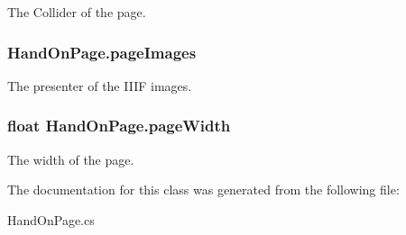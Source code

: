 The Collider of the page. 

\subsubsection[{page\+Images}]{ Hand\+On\+Page.\+page\+Images}\label{class_hand_on_page_a700380202f1cfd8554dfa85f918e16e8}


The presenter of the I\+I\+IF images. 

\subsubsection[{page\+Width}]{\setlength{\rightskip}{0pt plus 5cm}float Hand\+On\+Page.\+page\+Width}\label{class_hand_on_page_a83cc71512d2e86c90822af22ce14943d}


The width of the page. 



The documentation for this class was generated from the following file\+:\begin{DoxyCompactItemize}
\item 
Hand\+On\+Page.\+cs\end{DoxyCompactItemize}
